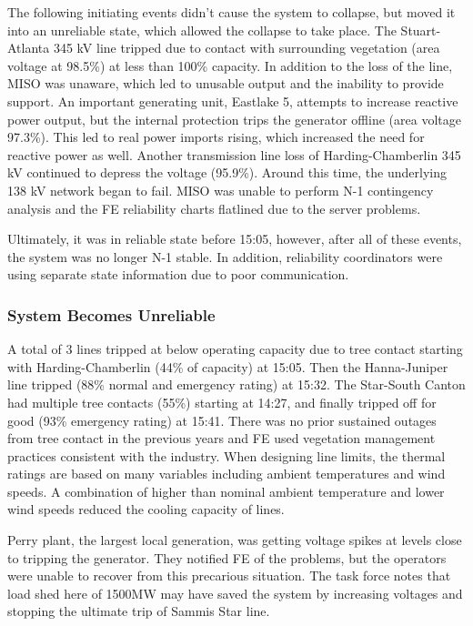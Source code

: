 The following initiating events didn't cause the system to collapse, but moved it into an unreliable state, which allowed the collapse to take place. The Stuart-Atlanta 345 kV line tripped due to contact with surrounding vegetation (area voltage at 98.5\%) at less than 100\% capacity.  In addition to the loss of the line, MISO was unaware, which led to unusable output and the inability to provide support.  An important generating unit, Eastlake 5, attempts to increase reactive power output, but the internal protection trips the generator offline (area voltage 97.3\%).  This led to real power imports rising, which increased the need for reactive power as well.  Another transmission line loss of Harding-Chamberlin 345 kV continued to depress the voltage (95.9\%).  Around this time, the underlying 138 kV network began to fail.   MISO was unable to perform N-1 contingency analysis and the FE reliability charts flatlined due to the server problems.

Ultimately, it was in reliable state before 15:05, however, after all of these events, the system was no longer N-1 stable.  In addition, reliability coordinators were using separate state information due to poor communication.  

\subsubsection{System Becomes Unreliable}

A total of 3 lines tripped at below operating capacity due to tree contact starting with Harding-Chamberlin (44\% of capacity) at 15:05.  Then the Hanna-Juniper line tripped (88\% normal and emergency rating) at 15:32.  The Star-South Canton had multiple tree contacts (55\%) starting at 14:27, and finally tripped off for good (93\% emergency rating)  at 15:41.  There was no prior sustained outages from tree contact in the previous years and FE used vegetation management practices consistent with the industry.  When designing line limits, the thermal ratings are based on many variables including ambient temperatures and wind speeds.  A combination of higher than nominal ambient temperature and lower wind speeds reduced the cooling capacity of lines.

Perry plant, the largest local generation, was getting voltage spikes at levels close to tripping the generator.  They notified FE of the problems, but the operators were unable to recover from this precarious situation.  The task force notes that load shed here of 1500MW may have saved the system by increasing voltages and stopping the ultimate trip of Sammis Star line.

